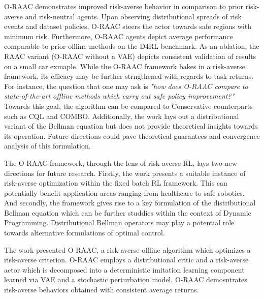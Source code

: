 \documentclass[11pt,letterpaper]{article}
\begin{document}
O-RAAC demonstrates improved risk-averse behavior in comparison to prior risk-averse and risk-neutral agents. Upon observing distributional spreads of risk events and dataset policies, O-RAAC steers the actor towards safe regions with minimum risk. Furthermore, O-RAAC agents depict average performance comparable to prior offline methods on the D4RL benchmark. As an ablation, the RAAC variant (O-RAAC without a VAE) depicts consistent validation of results on a small car exmaple. While the O-RAAC framework bakes in a risk-averse framework, its efficacy may be further strngthened with regards to task returns. For instance, the question that one may ask is \textit{"how does O-RAAC compare to state-of-the-art offline methods which carry out safe policy improvement?"} Towards this goal, the algorithm can be compared to Conservative counterparts such as CQL and COMBO. Additionally, the work lays out a distributional variant of the Bellman equation but does not provide theoretical insights towards its operation. Future directions could pave theoretical guarantees and convergence analysis of this formulation.

The O-RAAC framework, through the lens of risk-averse RL, lays two new directions for future research. Firstly, the work presents a suitable instance of risk-averse optimization within the fixed batch RL framework. This can potentially benefit application areas ranging from healthcare to safe robotics. And secondly, the framework gives rise to a key formulation of the distributional Bellman equation which can be further studdies within the context of Dynamic Programming. Distributional Bellman operators may play a potential role towards alternative formulations of optimal control.

The work presented O-RAAC, a risk-averse offline algorithm which optimizes a risk-averse criterion. O-RAAC employs a distributional critic and a risk-averse actor which is decomposed into a deterministic imitation learning component learned via VAE and a stochastic perturbation model. O-RAAC demosntrates risk-averse behaviors obtained with consistent average returns.
\end{document}
